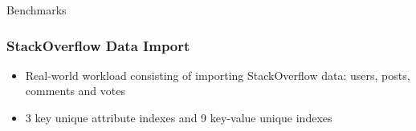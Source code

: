 \documentclass{beamer}
\begin{document}
\begin{section}{Benchmarks}

    \begin{frame}
      \frametitle{StackOverflow Data Import}
        \begin{itemize}
        \item Real-world workload consisting of importing StackOverflow data: users, posts, comments and votes     
        \item 3 key unique attribute indexes and 9 key-value unique indexes
        \end{itemize}
    \end{frame}
    

\end{section}
\end{document}

